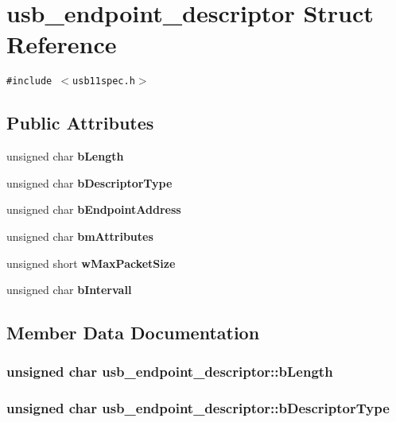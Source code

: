 \section{usb\_\-endpoint\_\-descriptor Struct Reference}
\label{structusb__endpoint__descriptor}
{\tt \#include $<$usb11spec.h$>$}

\subsection*{Public Attributes}
\begin{CompactItemize}
\item 
unsigned char {\bf b\-Length}
\item 
unsigned char {\bf b\-Descriptor\-Type}
\item 
unsigned char {\bf b\-Endpoint\-Address}
\item 
unsigned char {\bf bm\-Attributes}
\item 
unsigned short {\bf w\-Max\-Packet\-Size}
\item 
unsigned char {\bf b\-Intervall}
\end{CompactItemize}


\subsection{Member Data Documentation}
\subsubsection{\setlength{\rightskip}{0pt plus 5cm}unsigned char {\bf usb\_\-endpoint\_\-descriptor::b\-Length}}\label{structusb__endpoint__descriptor_792e72235bfbb42fe487246656fb9a57}


\subsubsection{\setlength{\rightskip}{0pt plus 5cm}unsigned char {\bf usb\_\-endpoint\_\-descriptor::b\-Descriptor\-Type}}\label{structusb__endpoint__descriptor_fae704c07c390d6c7bc74d32b409632a}



